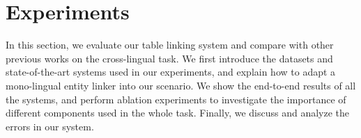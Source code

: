 \section{Experiments}
\label{sec:eval}



In this section, we evaluate our table linking system and compare with other previous works
on the cross-lingual task.
We first introduce the datasets and state-of-the-art systems used in our experiments,
and explain how to adapt a mono-lingual entity linker into our scenario.
We show the end-to-end results of all the systems, and perform ablation experiments to
investigate the importance of different components used in the whole task.
Finally, we discuss and analyze the errors in our system.









